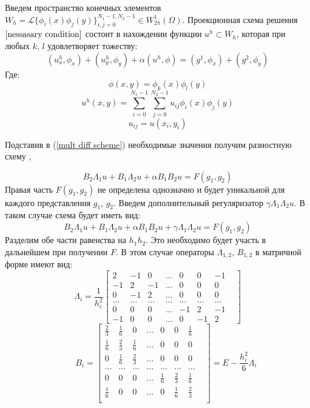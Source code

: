 \documentclass{article}
\begin{document}
Введем пространство конечных элементов $W_h = \mathscr{L}\{\phi_i(x)\phi_j(y)\}_{i,j=0}^{N_1 - 1,N_2-1} \in W_{2\pi}^{1}(\Omega)$. Проекционная схема решения $\ref{nessasary condition}$ состоит в нахождении функции $u^h \subset W_h$, которая при любых $k,\,l$ удовлетворяет тожеству:
\begin{equation}\label{mult diff scheme}
(u_x^h,\phi_x)+(u_y^h,\phi_y) + \alpha(u^h,\phi) = (g^1,\phi_x) + (g^2,\phi_y)
\end{equation}
Где:
$$\phi(x,y) = \phi_k(x)\phi_l(y)$$
$$u^h(x,y) = \sum \limits_{i=0}^{N_1-1} \sum \limits_{j=0}^{N_2-1} u_{ij}\phi_i(x)\phi_j(y)$$
$$u_{ij} = u(x_i,y_i)$$

Подставив в (\ref{mult diff scheme}) необходимые значения получим разностную схему \cite{marchuck}, \cite{vatiational_base}

\begin{equation}
B_2 \Lambda_1 u + B_1 \Lambda_2 u + \alpha B_1 B_2 u = F(g_1,g_2)
\end{equation}
Правая часть $F(g_1,g_2)$ не определена однозначно и будет уникальной для каждого представления $g_1,\,g_2$.
Введем дополнительный регуляризатор $\gamma\Lambda_1\Lambda_2u$. В таком случае схема будет иметь вид:
\begin{equation}\label{scheme}
B_2 \Lambda_1 u + B_1 \Lambda_2 u + \alpha B_1 B_2 u + \gamma\Lambda_1\Lambda_2u = F(g_1,g_2)
\end{equation}
Разделим обе части равенства на $h_1h_2$. Это необходимо будет участь в дальнейшем при получении $F$.
В этом случае операторы $\Lambda_{1,2},\,B_{1,2}$ в матричной форме имеют вид:
$$\Lambda_i = \frac{1}{h_i^2}
\begin{bmatrix}
2 & -1 & 0 & \ldots & 0 & 0 & -1\\
-1 & 2 & -1 & \ldots & 0 & 0 & 0\\
0 & -1 & 2 & \ldots &0 & 0 & 0\\
\ldots & \ldots & \ldots & \ldots & \ldots & \ldots & \ldots &\\
0 & 0 & 0 & \ldots & -1 & 2 & -1\\
-1 & 0 & 0 & \ldots & 0 & -1 & 2
\end{bmatrix}
$$
$$
\qquad B_i = 
\begin{bmatrix}
\frac{2}{3} & \frac{1}{6} & 0 & \ldots & 0 & 0 & \frac{1}{6}\\
\frac{1}{6} & \frac{2}{3} & \frac{1}{6} & \ldots & 0 & 0 & 0\\
0 & \frac{1}{6} & \frac{2}{3} & \ldots &0 & 0 & 0\\
\ldots & \ldots & \ldots & \ldots & \ldots & \ldots & \ldots &\\
0 & 0 & 0 & \ldots & \frac{1}{6} & \frac{2}{3} & \frac{1}{6}\\
\frac{1}{6} & 0 & 0 & \ldots & 0 & \frac{1}{6} & \frac{2}{3} \\
\end{bmatrix} = E - \frac{h_i^2}{6}\Lambda_i$$
\end{document}
